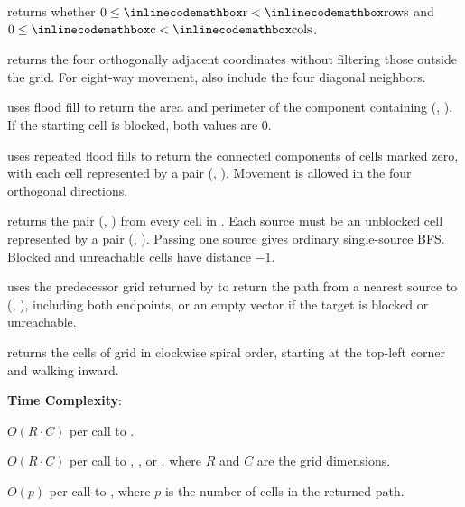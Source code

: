\begin{compactitem}
  \item {} returns whether $0 \leq {\inlinecodemath{r}} < {\inlinecodemath{rows}}$ and $0 \leq {\inlinecodemath{c}} < {\inlinecodemath{cols}}$.
  \item {} returns the four orthogonally adjacent coordinates without filtering those outside the grid. For eight-way movement, also include the four diagonal neighbors.
  \item {} uses flood fill to return the area and perimeter of the component containing (, ). If the starting cell is blocked, both values are $0$.
  \item {} uses repeated flood fills to return the connected components of cells marked zero, with each cell represented by a pair (, ). Movement is allowed in the four orthogonal directions.
  \item {} returns the pair (, ) from every cell in . Each source must be an unblocked cell represented by a pair (, ). Passing one source gives ordinary single-source BFS. Blocked and unreachable cells have distance $-1$.
  \item {} uses the predecessor grid returned by  to return the path from a nearest source to (, ), including both endpoints, or an empty vector if the target is blocked or unreachable.
  \item {} returns the cells of grid  in clockwise spiral order, starting at the top-left corner and walking inward.
\end{compactitem}

\textbf{Time Complexity}:
\begin{compactitem}
  \item $O(R \cdot C)$ per call to .
  \item $O(R \cdot C)$ per call to , , or , where $R$ and $C$ are the grid dimensions.
  \item $O(p)$ per call to , where $p$ is the number of cells in the returned path.
\end{compactitem}

